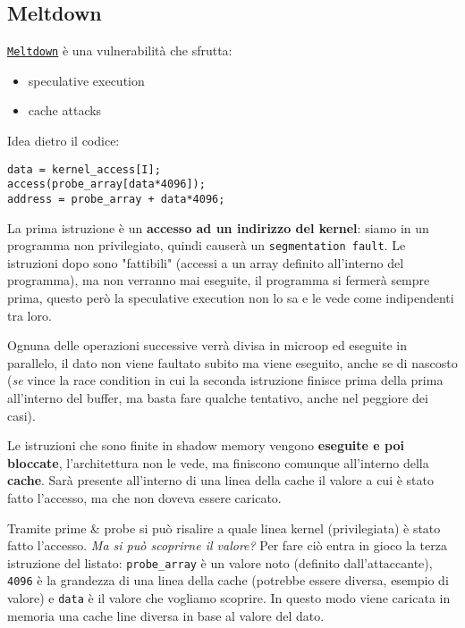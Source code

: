 \subsection{Meltdown}

\href{https://meltdownattack.com/meltdown.pdf}{\texttt{Meltdown}} è una vulnerabilità che sfrutta:
\begin{itemize}
	\item speculative execution
	
    \item cache attacks
\end{itemize}

Idea dietro il codice:
\begin{verbatim}
data = kernel_access[I];
access(probe_array[data*4096]);
address = probe_array + data*4096;
\end{verbatim}

La prima istruzione è un \textbf{accesso ad un indirizzo del kernel}: siamo in un programma non privilegiato, quindi causerà un \texttt{segmentation fault}. Le istruzioni dopo sono "fattibili" (accessi a un array definito all'interno del programma), ma non verranno mai eseguite, il programma si fermerà sempre prima, questo però la speculative execution non lo sa e le vede come indipendenti tra loro.

Ognuna delle operazioni successive verrà divisa in microop ed eseguite in parallelo, il dato non viene faultato subito ma viene eseguito, anche se di nascosto (\textit{se} vince la race condition in cui la seconda istruzione finisce prima della prima all'interno del buffer, ma basta fare qualche tentativo, anche nel peggiore dei casi).

Le istruzioni che sono finite in shadow memory vengono \textbf{eseguite e poi bloccate}, l'architettura non le vede, ma finiscono comunque all'interno della \textbf{cache}. Sarà presente all'interno di una linea della cache il valore a cui è stato fatto l'accesso, ma che non doveva essere caricato.

Tramite prime \& probe si può risalire a quale linea kernel (privilegiata) è stato fatto l'accesso. \textit{Ma si può scoprirne il valore?} Per fare ciò entra in gioco la terza istruzione del listato: \texttt{probe\_array} è un valore noto (definito dall'attaccante), \texttt{4096} è la grandezza di una linea della cache (potrebbe essere diversa, esempio di valore) e \texttt{data} è il valore che vogliamo scoprire. In questo modo viene caricata in memoria una cache line diversa in base al valore del dato.

